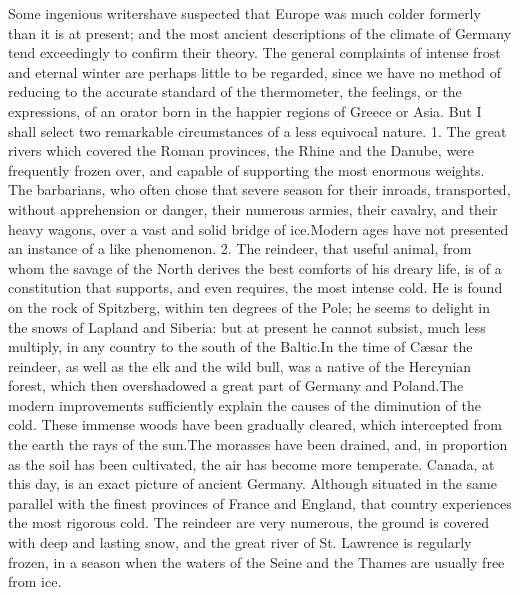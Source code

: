 Some ingenious writers\footnotemark[2] have suspected that Europe was much
colder formerly than it is at present; and the most ancient
descriptions of the climate of Germany tend exceedingly to
confirm their theory. The general complaints of intense frost and
eternal winter are perhaps little to be regarded, since we have
no method of reducing to the accurate standard of the
thermometer, the feelings, or the expressions, of an orator born
in the happier regions of Greece or Asia. But I shall select two
remarkable circumstances of a less equivocal nature. 1. The great
rivers which covered the Roman provinces, the Rhine and the
Danube, were frequently frozen over, and capable of supporting
the most enormous weights. The barbarians, who often chose that
severe season for their inroads, transported, without
apprehension or danger, their numerous armies, their cavalry, and
their heavy wagons, over a vast and solid bridge of ice.\footnotemark[3] Modern
ages have not presented an instance of a like phenomenon. 2. The
reindeer, that useful animal, from whom the savage of the North
derives the best comforts of his dreary life, is of a
constitution that supports, and even requires, the most intense
cold. He is found on the rock of Spitzberg, within ten degrees of
the Pole; he seems to delight in the snows of Lapland and
Siberia: but at present he cannot subsist, much less multiply, in
any country to the south of the Baltic.\footnotemark[4] In the time of Cæsar
the reindeer, as well as the elk and the wild bull, was a native
of the Hercynian forest, which then overshadowed a great part of
Germany and Poland.\footnotemark[5] The modern improvements sufficiently
explain the causes of the diminution of the cold. These immense
woods have been gradually cleared, which intercepted from the
earth the rays of the sun.\footnotemark[6] The morasses have been drained, and,
in proportion as the soil has been cultivated, the air has become
more temperate. Canada, at this day, is an exact picture of
ancient Germany. Although situated in the same parallel with the
finest provinces of France and England, that country experiences
the most rigorous cold. The reindeer are very numerous, the
ground is covered with deep and lasting snow, and the great river
of St. Lawrence is regularly frozen, in a season when the waters
of the Seine and the Thames are usually free from ice.\footnotemark[7]


